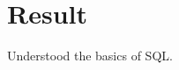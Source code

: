 \documentclass{article}
\begin{document}
\section{Result}

Understood the basics of SQL.

 
\end{document}
